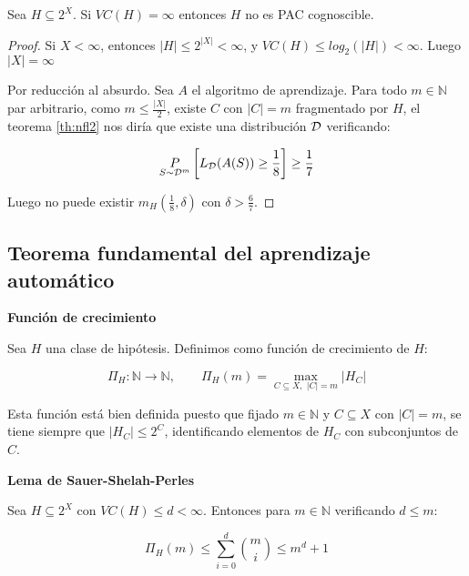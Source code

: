 \begin{corollary}
 Sea $H \subseteq 2^X$. Si $VC(H) = \infty$ entonces $H$ no es PAC cognoscible.
 \label{cor:vc-finito}
\end{corollary}

  \begin{proof}
  Si $X < \infty$, entonces $|H| \le 2^{|X|} < \infty$, y $VC(H) \le log_2(|H|) < \infty$. Luego $|X| = \infty$
  
  Por reducción al absurdo. Sea $A$ el algoritmo de aprendizaje. Para todo $m\in \mathbb{N}$ par arbitrario, como 
  $m\le \frac{|X|}{2}$, existe $C$ con $|C| = m$ fragmentado por $H$, el teorema \ref{th:nfl2} nos diría que existe una 
  distribución $\mathcal{D}$ verificando:
 
  \[\underset{S\sim \mathcal{D}^m}{P} \left[ L_{\mathcal{D}}(A(S)) \ge \frac{1}{8} \right] \ge \frac{1}{7}\]
 
  Luego no puede existir $m_H \left(\frac{1}{8}, \delta\right)$ con $\delta > \frac{6}{7}$.
  \end{proof}
  
\subsection{Teorema fundamental del aprendizaje automático}

\begin{definition}
\textbf{Función de crecimiento}

Sea $H$ una clase de hipótesis. Definimos como función de crecimiento de $H$:

\[\Pi_{H}: \mathbb{N} \longrightarrow \mathbb{N}, \qquad \Pi_{H}(m) = \max_{C \subseteq X, \,\, |C|=m} |H_C|\]
\end{definition}

Esta función está bien definida puesto que fijado $m \in \mathbb{N}$ y $C\subseteq X$ con $|C| = m$, se tiene siempre 
que $|H_C| \le 2^C$, identificando elementos de $H_C$ con subconjuntos de $C$.

\begin{lemma} \textbf{Lema de Sauer-Shelah-Perles}

Sea $H \subseteq 2^X$ con $VC(H) \le d < \infty$. Entonces para $m\in \mathbb{N}$ verificando $d\le m$:

\[\Pi_{H} (m) \le \sum_{i=0}^d \binom{m}{i} \le m^d + 1\]
\label{lemma:sauer}
\end{lemma}


